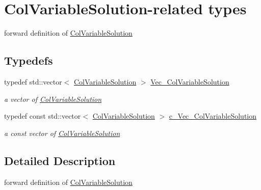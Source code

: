 \hypertarget{group___col_variable_solution___t_y_p_e_s}{}\section{Col\+Variable\+Solution-\/related types}
\label{group___col_variable_solution___t_y_p_e_s}


forward definition of \mbox{\hyperlink{class_s_m_spp__di__unipi__it_1_1_col_variable_solution}{Col\+Variable\+Solution}}  


\subsection*{Typedefs}
\begin{DoxyCompactItemize}
\item 
\mbox{\label{group___col_variable_solution___t_y_p_e_s_gad843ca4ba6da2f653bbc07a62a8c49dd}} 
typedef std\+::vector$<$ \mbox{\hyperlink{class_s_m_spp__di__unipi__it_1_1_col_variable_solution}{Col\+Variable\+Solution}} $>$ \mbox{\hyperlink{group___col_variable_solution___t_y_p_e_s_gad843ca4ba6da2f653bbc07a62a8c49dd}{Vec\+\_\+\+Col\+Variable\+Solution}}
\begin{DoxyCompactList}\small\item\em a vector of \mbox{\hyperlink{class_s_m_spp__di__unipi__it_1_1_col_variable_solution}{Col\+Variable\+Solution}} \end{DoxyCompactList}\item 
\mbox{\label{group___col_variable_solution___t_y_p_e_s_gac9f0485d8cd9fac29d0b83dbc3242c0e}} 
typedef const std\+::vector$<$ \mbox{\hyperlink{class_s_m_spp__di__unipi__it_1_1_col_variable_solution}{Col\+Variable\+Solution}} $>$ \mbox{\hyperlink{group___col_variable_solution___t_y_p_e_s_gac9f0485d8cd9fac29d0b83dbc3242c0e}{c\+\_\+\+Vec\+\_\+\+Col\+Variable\+Solution}}
\begin{DoxyCompactList}\small\item\em a const vector of \mbox{\hyperlink{class_s_m_spp__di__unipi__it_1_1_col_variable_solution}{Col\+Variable\+Solution}} \end{DoxyCompactList}\end{DoxyCompactItemize}


\subsection{Detailed Description}
forward definition of \mbox{\hyperlink{class_s_m_spp__di__unipi__it_1_1_col_variable_solution}{Col\+Variable\+Solution}} 

